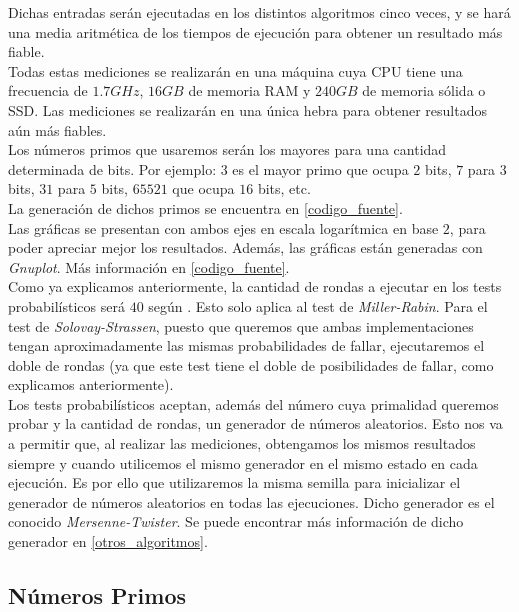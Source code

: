 Dichas entradas serán ejecutadas en los distintos algoritmos cinco veces, y se hará una media aritmética de los tiempos de ejecución para obtener un resultado más fiable.\\

Todas estas mediciones se realizarán en una máquina cuya CPU tiene una frecuencia de $1.7GHz$, $16GB$ de memoria RAM y $240GB$ de memoria sólida o SSD. Las mediciones se realizarán en una única hebra para obtener resultados aún más fiables.\\

Los números primos que usaremos serán los mayores para una cantidad determinada de bits. Por ejemplo: $3$ es el mayor primo que ocupa $2$ bits, $7$ para $3$ bits, $31$ para $5$ bits, $65521$ que ocupa $16$ bits, etc.\\

La generación de dichos primos se encuentra en \autoref{codigo_fuente}.\\

Las gráficas se presentan con ambos ejes en escala logarítmica en base $2$, para poder apreciar mejor los resultados. Además, las gráficas están generadas con \textit{Gnuplot}. Más información en \autoref{codigo_fuente}.\\

Como ya explicamos anteriormente, la cantidad de rondas a ejecutar en los tests probabilísticos será $40$ según \cite{digital_signature_standard}. Esto solo aplica al test de \textit{Miller-Rabin}. Para el test de \textit{Solovay-Strassen}, puesto que queremos que ambas implementaciones tengan aproximadamente las mismas probabilidades de fallar, ejecutaremos el doble de rondas (ya que este test tiene el doble de posibilidades de fallar, como explicamos anteriormente).\\

Los tests probabilísticos aceptan, además del número cuya primalidad queremos probar y la cantidad de rondas, un generador de números aleatorios. Esto nos va a permitir que, al realizar las mediciones, obtengamos los mismos resultados siempre y cuando utilicemos el mismo generador en el mismo estado en cada ejecución. Es por ello que utilizaremos la misma semilla para inicializar el generador de números aleatorios en todas las ejecuciones. Dicho generador es el conocido \textit{Mersenne-Twister}. Se puede encontrar más información de dicho generador en \autoref{otros_algoritmos}.

\subsection{Números Primos}

